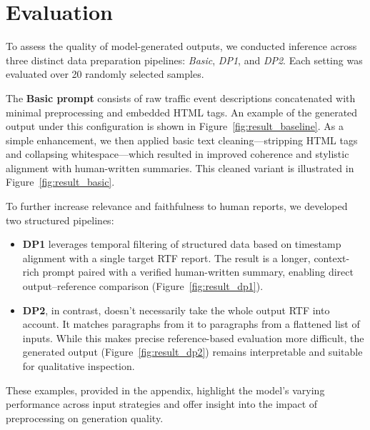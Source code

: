 \section*{Evaluation}

To assess the quality of model-generated outputs, we conducted inference across three distinct data preparation pipelines: \textit{Basic}, \textit{DP1}, and \textit{DP2}. Each setting was evaluated over 20 randomly selected samples.

The \textbf{Basic prompt} consists of raw traffic event descriptions concatenated with minimal preprocessing and embedded HTML tags. An example of the generated output under this configuration is shown in Figure~\ref{fig:result_baseline}. As a simple enhancement, we then applied basic text cleaning—stripping HTML tags and collapsing whitespace—which resulted in improved coherence and stylistic alignment with human-written summaries. This cleaned variant is illustrated in Figure~\ref{fig:result_basic}.

To further increase relevance and faithfulness to human reports, we developed two structured pipelines:
\begin{itemize}
    \item \textbf{DP1} leverages temporal filtering of structured data based on timestamp alignment with a single target RTF report. The result is a longer, context-rich prompt paired with a verified human-written summary, enabling direct output–reference comparison (Figure~\ref{fig:result_dp1}).
    
    \item \textbf{DP2}, in contrast, doesn't necessarily take the whole output RTF into account.
    It matches paragraphs from it to paragraphs from a flattened list of inputs.
    While this makes precise reference-based evaluation more difficult, the generated output (Figure~\ref{fig:result_dp2}) remains interpretable and suitable for qualitative inspection.
\end{itemize}

These examples, provided in the appendix, highlight the model’s varying performance across input strategies and offer insight into the impact of preprocessing on generation quality.


